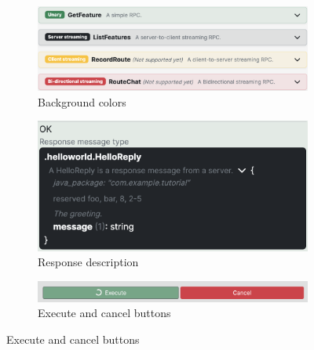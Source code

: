 \newpage


\begin{figure}[!htb]
    \centering
    \captionsetup{justification=centering}

    \begin{subfigure}{.5\textwidth}
        \centering
        \includegraphics[width=.95\linewidth]{images/testing/screenshots/testing-background-colors}
        \caption{Background colors}
        \label{fig:testing-changes-background-colors}
    \end{subfigure}%
    \begin{subfigure}{.5\textwidth}
        \centering
        \includegraphics[width=.95\linewidth]{images/testing/screenshots/testing-response-description}
        \caption{Response description}
        \label{fig:testing-changes-response}
    \end{subfigure}%

    \vspace{15mm}%

    \begin{subfigure}{.85\textwidth}
        \centering
        \includegraphics[width=.95\linewidth]{images/testing/screenshots/testing-cancel}
        \caption{Execute and cancel buttons}
        \label{fig:testing-changes-cancel}
    \end{subfigure}%


\end{figure}
